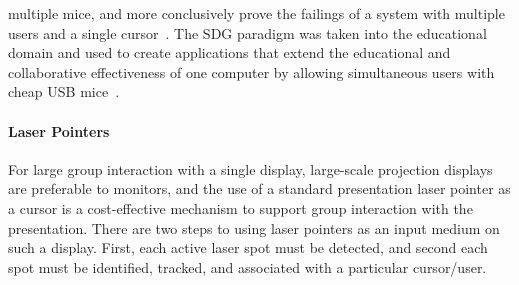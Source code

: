 \documentclass[runningheads,a4paper]{llncs}
\begin{document}
multiple mice, and more conclusively prove the failings of a
system with multiple users and a single cursor~\cite{Pawar2007}.
% 
The SDG paradigm was 
taken into the educational domain and 
used to create applications that
extend the educational and collaborative effectiveness of one computer by
allowing simultaneous users with cheap USB mice~\cite{Pawar2006}. 


\vspace{-0.15in}
\paragraph{\bf Laser Pointers}
For large group interaction with a single display, 
large-scale projection displays are preferable to monitors,
and the use of a standard presentation laser pointer as a
cursor is a cost-effective mechanism to support group interaction with
the presentation.
There are two steps to using laser pointers as an input medium on such
a display.  First, each active laser spot must be detected, and
second each spot must be identified, tracked, and associated
with
a particular cursor/user.
\end{document}

